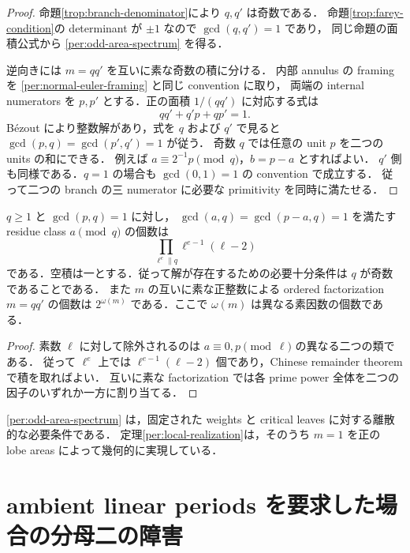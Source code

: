 \begin{proof}
命題\ref{trop:branch-denominator}により $q,q'$ は奇数である．
命題\ref{trop:farey-condition}の determinant が $\pm1$ なので $\gcd(q,q')=1$ であり，
同じ命題の面積公式から \eqref{per:odd-area-spectrum} を得る．

逆向きには $m=qq'$ を互いに素な奇数の積に分ける．
内部 annulus の framing を \eqref{per:normal-euler-framing} と同じ convention に取り，
両端の internal numerators を $p,p'$ とする．正の面積 $1/(qq')$ に対応する式は
\[
 qq'+q'p+qp'=1.
\]
B\'ezout により整数解があり，式を $q$ および $q'$ で見ると
$\gcd(p,q)=\gcd(p',q')=1$ が従う．
奇数 $q$ では任意の unit $p$ を二つの units の和にできる．
例えば $a\equiv2^{-1}p\pmod q$，$b=p-a$ とすればよい．
$q'$ 側も同様である．$q=1$ の場合も $\gcd(0,1)=1$ の convention で成立する．
従って二つの branch の三 numerator に必要な primitivity を同時に満たせる．
\end{proof}

\begin{lemma}
\label{per:unit-split-count}
$q\ge1$ と $\gcd(p,q)=1$ に対し，
$\gcd(a,q)=\gcd(p-a,q)=1$ を満たす residue class $a\pmod q$ の個数は
\[
 \prod_{\ell^e\parallel q}\ell^{e-1}(\ell-2)
\]
である．空積は一とする．従って解が存在するための必要十分条件は $q$ が奇数であることである．
また $m$ の互いに素な正整数による ordered factorization $m=qq'$ の個数は
$2^{\omega(m)}$ である．ここで $\omega(m)$ は異なる素因数の個数である．
\end{lemma}

\begin{proof}
素数 $\ell$ に対して除外されるのは $a\equiv0,p\pmod\ell$ の異なる二つの類である．
従って $\ell^e$ 上では $\ell^{e-1}(\ell-2)$ 個であり，Chinese remainder theorem で積を取ればよい．
互いに素な factorization では各 prime power 全体を二つの因子のいずれか一方に割り当てる．
\end{proof}

\eqref{per:odd-area-spectrum} は，固定された weights と critical leaves に対する離散的な必要条件である．
定理\ref{per:local-realization}は，そのうち $m=1$ を正の lobe areas によって幾何的に実現している．



\section{ambient linear periods を要求した場合の分母二の障害}
\label{per:ambient-section}

